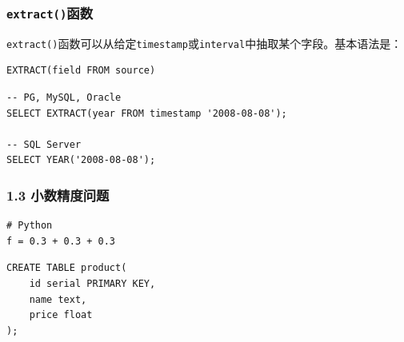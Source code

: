 \documentclass[aspectratio=169, 14pt]{beamer}
\begin{document}
\begin{frame}[fragile]
    \frametitle{\texttt{extract()}函数}
\alert{\texttt{extract()}}函数可以从给定\texttt{timestamp}或\texttt{interval}中抽取某个字段。基本语法是：

\begin{verbatim}
EXTRACT(field FROM source)
\end{verbatim}

\begin{verbatim}
-- PG, MySQL, Oracle
SELECT EXTRACT(year FROM timestamp '2008-08-08');

-- SQL Server
SELECT YEAR('2008-08-08');
        \end{verbatim}
    

\end{frame}

\begin{frame}[fragile]
    \frametitle{1.3 小数精度问题}


    \begin{verbatim}
# Python
f = 0.3 + 0.3 + 0.3
    \end{verbatim}

\begin{verbatim}
CREATE TABLE product(
    id serial PRIMARY KEY,
    name text,
    price float
);
\end{verbatim}

\end{frame}
\end{document}
